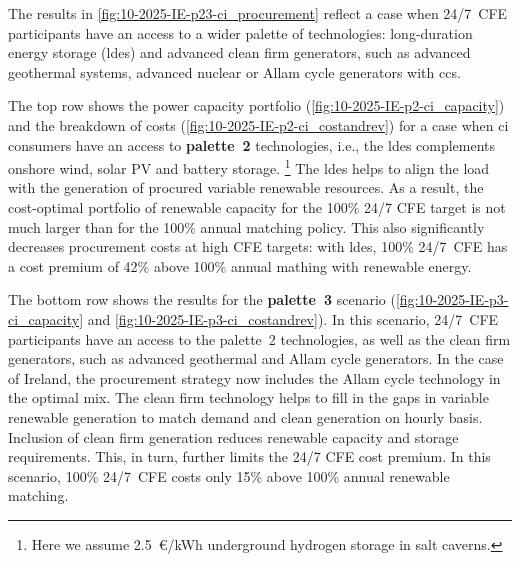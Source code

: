 The results in \cref{fig:10-2025-IE-p23-ci_procurement} reflect a case when 24/7~CFE participants have an access to a wider palette of technologies: 
long-duration energy storage (\gls{ldes}) and advanced clean firm generators, such as advanced geothermal systems, advanced nuclear or Allam cycle generators with \gls{ccs}.

The top row shows the power capacity portfolio (\cref{fig:10-2025-IE-p2-ci_capacity}) and the breakdown of costs (\cref{fig:10-2025-IE-p2-ci_costandrev}) for a case when \gls{ci} consumers have an access to \textbf{palette~2} technologies, i.e., the \gls{ldes} complements onshore wind, solar PV and battery storage.%
\footnote{Here we assume 2.5~\euro/kWh underground hydrogen storage in salt caverns.}
The \gls{ldes} helps to align the load with the generation of procured variable renewable resources. 
As a result, the cost-optimal portfolio of renewable capacity for the 100\% 24/7 CFE target is not much larger than for the 100\% annual matching policy. 
This also significantly decreases procurement costs at high CFE targets: with \gls{ldes}, 100\% 24/7~CFE has a cost premium of 42\% above 100\% annual mathing with renewable energy.

The bottom row shows the results for the \textbf{palette~3} scenario (\cref{fig:10-2025-IE-p3-ci_capacity} and \cref{fig:10-2025-IE-p3-ci_costandrev}). 
In this scenario, 24/7~CFE participants have an access to the palette~2 technologies, as well as the clean firm generators, such as advanced geothermal and Allam cycle generators.
In the case of Ireland, the procurement strategy now includes the Allam cycle technology in the optimal mix.
The clean firm technology helps to fill in the gaps in variable renewable generation to match demand and clean generation on hourly basis.
Inclusion of clean firm generation reduces renewable capacity and storage requirements. 
This, in turn, further limits the 24/7 CFE cost premium.
In this scenario, 100\% 24/7~CFE costs only 15\% above 100\% annual renewable matching.


